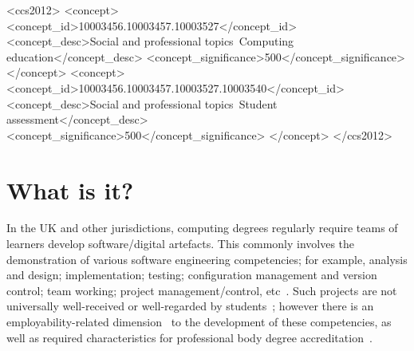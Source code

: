 \documentclass[sigconf, anonymous=false]{acmart}
\begin{document}
\begin{CCSXML}
	<ccs2012>
	<concept>
	<concept_id>10003456.10003457.10003527</concept_id>
	<concept_desc>Social and professional topics~Computing education</concept_desc>
	<concept_significance>500</concept_significance>
	</concept>
	<concept>
	<concept_id>10003456.10003457.10003527.10003540</concept_id>
	<concept_desc>Social and professional topics~Student assessment</concept_desc>
	<concept_significance>500</concept_significance>
	</concept>
	</ccs2012>
\end{CCSXML}


\maketitle


\section{What is it?}	
\label{sec:What}
In the UK and other jurisdictions, computing degrees regularly
require teams of learners develop software/digital
artefacts. This commonly involves the demonstration of various
software engineering competencies; for example, analysis and design;
implementation; testing; configuration management and version control;
team working; project management/control,
etc~\cite{davenport-et-al:latice2016}. Such projects are not
universally well-received or well-regarded by
students~\cite{Gordon2010}; however there is an employability-related
dimension~\cite{Thomas2003, Mitchell2021} to the development of these
competencies, as well as required characteristics for professional
body degree accreditation~\cite{Crick2020}.
\end{document}
